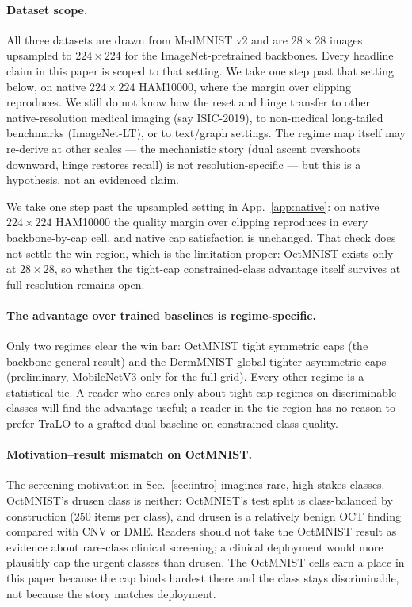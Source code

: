 \documentclass[10pt]{article}
\begin{document}
\paragraph{Dataset scope.}
All three datasets are drawn from MedMNIST v2 and are $28{\times}28$
images upsampled to $224{\times}224$ for the ImageNet-pretrained
backbones. Every headline claim in this paper is scoped to that setting.
{We take one step past that setting below, on native
$224{\times}224$ HAM10000, where the margin over clipping reproduces. We
still do not know how the reset and hinge transfer to other
native-resolution medical imaging (say ISIC-2019), to non-medical}
long-tailed benchmarks (ImageNet-LT), or to text/graph settings. The
regime map itself may re-derive at other scales --- the mechanistic story
(dual ascent overshoots downward, hinge restores recall) is not
resolution-specific --- but this is a hypothesis, not an evidenced claim.

{We take one step past the upsampled setting in App.~\ref{app:native}:
on native $224{\times}224$ HAM10000 the quality margin over clipping reproduces in
every backbone-by-cap cell, and native cap satisfaction is unchanged. That check
does not settle the win region, which is the limitation proper: OctMNIST exists
only at $28{\times}28$, so whether the tight-cap constrained-class advantage itself
survives at full resolution remains open.}

\paragraph{The advantage over trained baselines is regime-specific.}
Only two regimes clear the win bar: OctMNIST tight symmetric caps (the
backbone-general result) and the DermMNIST global-tighter asymmetric caps
(preliminary, MobileNetV3-only for the full grid). Every other regime is
a statistical tie. A reader who cares only about tight-cap regimes on
discriminable classes will find the advantage useful; a reader in the
tie region has no reason to prefer TraLO to a grafted dual baseline on
constrained-class quality.

\paragraph{Motivation--result mismatch on OctMNIST.}
The screening motivation in Sec.~\ref{sec:intro} imagines rare, high-stakes
classes. OctMNIST's drusen class is neither: OctMNIST's test split is
class-balanced by construction ($250$ items per class), and drusen is a
relatively benign OCT finding compared with CNV or DME. Readers should
not take the OctMNIST result as evidence about rare-class clinical
screening; a clinical deployment would more plausibly cap the urgent
classes than drusen. The OctMNIST cells earn a place in this paper
because the cap binds hardest there and the class stays discriminable,
not because the story matches deployment.
\end{document}
